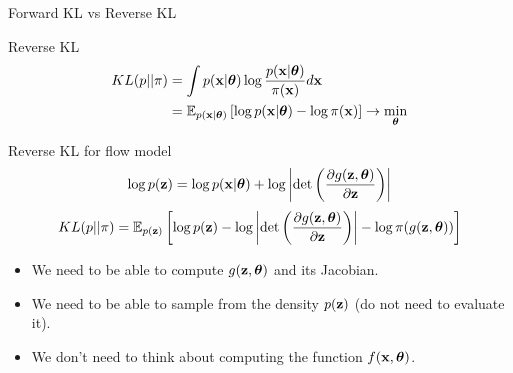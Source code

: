 \begin{frame}{Forward KL vs Reverse KL}
	\begin{block}{Reverse KL}
	  	\vspace{-0.5cm}
			\begin{align*}
				KL(p || \pi) &= \int p(\mathbf{x} | \boldsymbol{\theta}) \log \frac{p(\mathbf{x} | \boldsymbol{\theta})}{\pi(\mathbf{x})} d \mathbf{x} \\
				&= \mathbb{E}_{p(\mathbf{x} | \boldsymbol{\theta})} \left[\log p(\mathbf{x} | \boldsymbol{\theta}) - \log \pi(\mathbf{x})\right] \rightarrow \min_{\boldsymbol{\theta}}
			\end{align*}
		\vspace{-0.7cm}
	\end{block}
	\begin{block}{Reverse KL for flow model}
  		\vspace{-0.3cm}
		\[
			\log p(\mathbf{z}) = \log p(\mathbf{x} | \boldsymbol{\theta}) + \log \left|\det \left( \frac{\partial g(\mathbf{z}, \boldsymbol{\theta})}{\partial \mathbf{z}} \right) \right|
		\]
		\[
			KL(p || \pi)  = \mathbb{E}_{p(\mathbf{z})} \left[  \log p(\mathbf{z}) - \log \left|\det \left( \frac{\partial g(\mathbf{z}, \boldsymbol{\theta})}{\partial \mathbf{z}} \right) \right| - \log \pi(g(\mathbf{z}, \boldsymbol{\theta})) \right]
		\]
		\begin{itemize}
		\item We need to be able to compute $g(\mathbf{z}, \boldsymbol{\theta})$ and its Jacobian.
		\item We need to be able to sample from the density $p(\mathbf{z})$ (do not need to evaluate it).
		\item We don’t need to think about computing the function $f(\mathbf{x}, \boldsymbol{\theta})$.
		\end{itemize}
	\end{block}
\end{frame}
